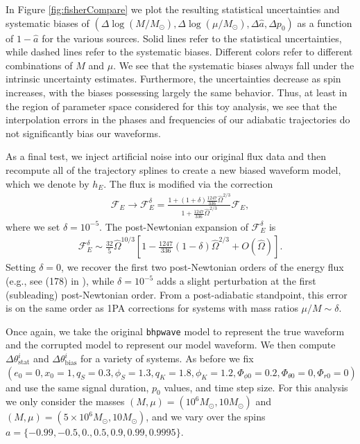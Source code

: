 \documentclass[%
 reprint,
 nofootinbib,
 amsmath,amssymb,
 aps,
 prd,
]{revtex4-2}
\begin{document}
In Figure \ref{fig:fisherCompare} we plot the resulting statistical uncertainties and systematic biases of $(\Delta\log(M/M_\odot), \Delta\log(\mu/M_\odot), \Delta \hat{a}, \Delta p_0)$ as a function of $1-\hat{a}$ for the various sources. Solid lines refer to the statistical uncertainties, while dashed lines refer to the systematic biases. Different colors refer to different combinations of $M$ and $\mu$. We see that the systematic biases always fall under the intrinsic uncertainty estimates. Furthermore, the uncertainties decrease as spin increases, with the biases possessing largely the same behavior. Thus, at least in the region of parameter space considered for this toy analysis, we see that the interpolation errors in the phases and frequencies of our adiabatic trajectories do not significantly bias our waveforms.

As a final test, we inject artificial noise into our original flux data and then recompute all of the trajectory splines to create a new biased waveform model, which we denote by $h_E$. The flux is modified via the correction
\begin{align}
    \mathcal{F}_E \rightarrow\mathcal{F}^\delta_E = \frac{1 + (1 + \delta)\frac{1247}{336}\hat{\Omega}^{2/3}}{1 + \frac{1247}{336}\hat{\Omega}^{2/3}} \mathcal{F}_E,
\end{align}
where we set $\delta = 10^{-5}$. The post-Newtonian expansion of $\mathcal{F}^\delta_E$ is
\begin{align}
    \mathcal{F}^\delta_E \sim \frac{32}{5}\hat{\Omega}^{10/3}\left[1 - \frac{1247}{336}(1 - \delta) \hat{\Omega}^{2/3} + O(\hat{\Omega}) \right].
\end{align}
Setting $\delta = 0$, we recover the first two post-Newtonian orders of the energy flux (e.g., see (178) in \cite{SasaTago03}), while $\delta = 10^{-5}$ adds a slight perturbation at the first (subleading) post-Newtonian order. From a post-adiabatic standpoint, this error is on the same order as 1PA corrections for systems with mass ratios $\mu/M \sim \delta$. 

Once again, we take the original \texttt{bhpwave} model to represent the true waveform and the corrupted model to represent our model waveform. We then compute $\Delta \theta^i_\mathrm{stat}$ and $\Delta \theta^i_\mathrm{bias}$ for a variety of systems. As before we fix $(e_0 = 0, x_0 = 1, q_S = 0.3, \phi_S = 1.3, q_K = 1.8, \phi_K = 1.2, \Phi_{\phi 0} = 0.2, \Phi_{\theta0} = 0, \Phi_{r0} = 0)$ and use the same signal duration, $p_0$ values, and time step size. For this analysis we only consider the masses $(M, \mu) = (10^6 M_\odot, 10 M_\odot)$ and $(M, \mu) = (5\times 10^6 M_\odot, 10 M_\odot)$, and we vary over the spins $a = \{-0.99, -0.5, 0., 0.5, 0.9, 0.99, 0.9995\}$.
\end{document}
